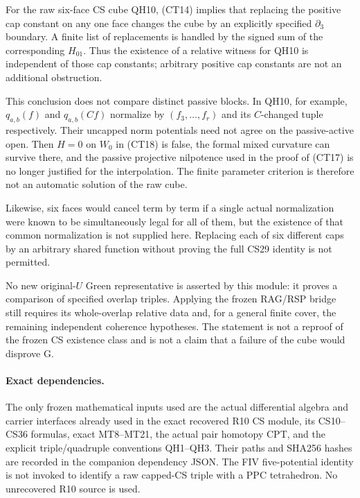 For the raw six-face CS cube QH10, (CT14) implies that replacing the
positive cap constant on any one face changes the cube by an explicitly
specified $\partial_3$ boundary.  A finite list of replacements is
handled by the signed sum of the corresponding $H_{01}$.  Thus the
existence of a relative witness for QH10 is independent of those cap
constants; arbitrary positive cap constants are not an additional
obstruction.

This conclusion does not compare distinct passive blocks.  In QH10,
for example, $q_{a,b}(f)$ and $q_{a,b}(Cf)$ normalize by
$(f_3,\ldots,f_r)$ and its $C$-changed tuple respectively.  Their
uncapped norm potentials need not agree on the passive-active open.
Then $H=0$ on $W_0$ in (CT18) is false, the formal mixed curvature
can survive there, and the passive projective nilpotence used in
the proof of (CT17) is no longer justified for the interpolation.
The finite parameter criterion is therefore not an automatic
solution of the raw cube.

Likewise, six faces would cancel term by term if a single actual
normalization were known to be simultaneously legal for all of them,
but the existence of that common normalization is not supplied here.
Replacing each of six different caps by an arbitrary shared function
without proving the full CS29 identity is not permitted.

No new original-$U$ Green representative is asserted by this module:
it proves a comparison of specified overlap triples.  Applying the
frozen RAG/RSP bridge still requires its whole-overlap relative data
and, for a general finite cover, the remaining independent coherence
hypotheses.  The statement is not a reproof of the frozen CS existence
class and is not a claim that a failure of the cube would disprove G.

\paragraph{Exact dependencies.}
The only frozen mathematical inputs used are the actual differential
algebra and carrier interfaces already used in the exact recovered
R10 CS module, its CS10--CS36 formulas, exact MT8--MT21, the actual
pair homotopy CPT, and the explicit triple/quadruple conventions
QH1--QH3.  Their paths and SHA256 hashes are recorded in the companion
dependency JSON.  The FIV five-potential identity is not invoked to
identify a raw capped-CS triple with a PPC tetrahedron.  No unrecovered
R10 source is used.
